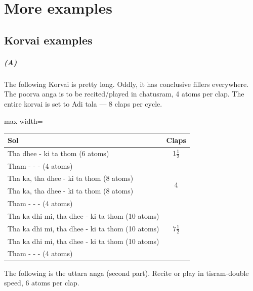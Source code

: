 \chapter{More examples}

\section{Korvai examples}

\paragraph{(A)}
The following Korvai is pretty long. Oddly, it has conclusive fillers everywhere. The
poorva anga is to be recited/played in chatusram, 4 atoms per clap. The entire korvai
is set to Adi tala --- 8 claps per cycle.

\begin{center}
\begin{adjustbox}{max width=\textwidth}
\begin{tabular}{l c}
\toprule
Sol & Claps\\
\midrule
Tha dhee - ki ta thom (6 atoms) & $1\frac{1}{2}$\\
Tham - - - (4 atoms)            & \\
\midrule
Tha ka, tha dhee - ki ta thom (8 atoms) & \multirow{2}{*}{4}\\
Tha ka, tha dhee - ki ta thom (8 atoms) & \\
Tham - - - (4 atoms)                    & \\
\midrule
Tha ka dhi mi, tha dhee - ki ta thom (10 atoms) & \multirow{3}{*}{$7\frac{1}{2}$}\\
Tha ka dhi mi, tha dhee - ki ta thom (10 atoms) & \\
Tha ka dhi mi, tha dhee - ki ta thom (10 atoms) & \\
Tham - - - (4 atoms)                            & \\
\bottomrule
\end{tabular}
\end{adjustbox}
\end{center}

The following is the uttara anga (second part). Recite or play in tisram-double speed,
6 atoms per clap.

